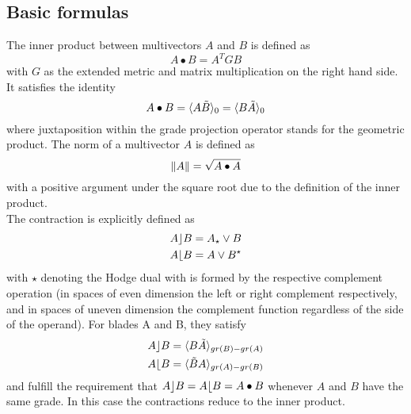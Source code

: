 \subsection{Basic formulas}

The inner product between multivectors $A$ and $B$ is defined as
\begin{equation}
    A \bullet B = A^{T} G B
    \label{eg:inner_product_metric}
\end{equation}
with $G$ as the extended metric and matrix multiplication on the right hand side. It
satisfies the identity
\begin{equation}
    A \bullet B  = \langle {A \tilde{B}} \rangle_{0} = \langle { B \tilde{A} } \rangle_{0}
    \label{eq:inner_product_link_to_gpr}
\end{equation}
where juxtaposition within the grade projection operator stands for the geometric product.
The norm of a multivector $A$ is defined as
\begin{equation}
    \left \lVert {A} \right \rVert = \sqrt{A \bullet A}
    \label{eq:norm_mv}
\end{equation}
with a positive argument under the square root due to the definition of the inner product.
\\

The contraction is explicitly defined as
\begin{subequations}
    \begin{align}
    A \rfloor B & = A_{\star} \vee B
    \label{eq:lcontr} \\
    A \lfloor B & = A \vee B^{\star}
    \label{eq:rcontr}
    \end{align}
\end{subequations}
with $\star$ denoting the Hodge dual with is formed by the respective complement operation
(in spaces of even dimension the left or right complement respectively, and in spaces of
uneven dimension the complement function regardless of the side of the operand). For
blades A and B, they satisfy
\begin{subequations}
    \begin{align}
    A \rfloor B & = \langle {B \tilde{A}} \rangle_{gr(B)-gr(A)}
    \label{eq:lcontr_gpr} \\
    A \lfloor B & = \langle {\tilde{B} A} \rangle_{gr(A)-gr(B)}
    \label{eq:rcontr_gpr}
    \end{align}
\end{subequations}
and fulfill the requirement that $A \rfloor B = A \lfloor B = A \bullet B$ whenever $A$
and $B$ have the same grade. In this case the contractions reduce to the inner product. \\



